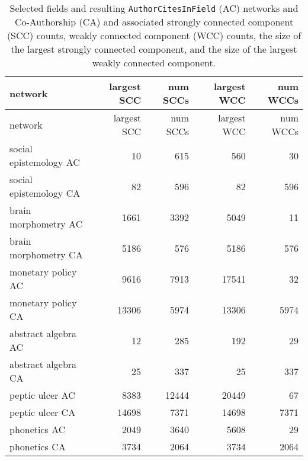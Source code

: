 \begin{longtable}[]{@{}lrrrr@{}}
\caption{Selected fields and resulting \texttt{AuthorCitesInField} (AC)
networks and Co-Authorship (CA) and associated strongly connected
component (SCC) counts, weakly connected component (WCC) counts, the
size of the largest strongly connected component, and the size of the
largest weakly connected component.
\label{tbl:networkscc}}\tabularnewline
\toprule
network & largest SCC & num SCCs & largest WCC & num WCCs\tabularnewline
\midrule
\endfirsthead
\toprule
network & largest SCC & num SCCs & largest WCC & num WCCs\tabularnewline
\midrule
\endhead
social epistemology AC & 10 & 615 & 560 & 30\tabularnewline
social epistemology CA & 82 & 596 & 82 & 596\tabularnewline
brain morphometry AC & 1661 & 3392 & 5049 & 11\tabularnewline
brain morphometry CA & 5186 & 576 & 5186 & 576\tabularnewline
monetary policy AC & 9616 & 7913 & 17541 & 32\tabularnewline
monetary policy CA & 13306 & 5974 & 13306 & 5974\tabularnewline
abstract algebra AC & 12 & 285 & 192 & 29\tabularnewline
abstract algebra CA & 25 & 337 & 25 & 337\tabularnewline
peptic ulcer AC & 8383 & 12444 & 20449 & 67\tabularnewline
peptic ulcer CA & 14698 & 7371 & 14698 & 7371\tabularnewline
phonetics AC & 2049 & 3640 & 5608 & 29\tabularnewline
phonetics CA & 3734 & 2064 & 3734 & 2064\tabularnewline
\bottomrule
\end{longtable}
